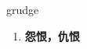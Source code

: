 
\begin{frame}
{\huge grudge}
\begin{center}
\begin{enumerate}\Large
  \item \textbf{怨恨，仇恨}
\end{enumerate}
\end{center}
\end{frame}
